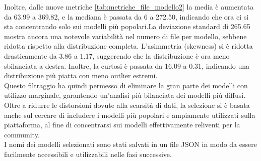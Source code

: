 \documentclass{article}
\begin{document}
Inoltre, dalle nuove metriche \ref{tab:metriche_file_modello2} la media è aumentata da 63.99 a 369.82, e la mediana è passata da 6 a 272.50, indicando che ora ci si sta concentrando solo sui modelli più popolari.La deviazione standard di 265.65 mostra ancora una notevole variabilità nel numero di file per modello, sebbene ridotta rispetto alla distribuzione completa. L’asimmetria (skewness) si è ridotta drasticamente da 3.86 a 1.17, suggerendo che la distribuzione è ora meno sbilanciata a destra. Inoltre, la curtosi è passata da 16.09 a 0.31, indicando una distribuzione più piatta con meno outlier estremi.\\
Questo filtraggio ha quindi permesso di eliminare la gran parte dei modelli con utilizzo marginale, garantendo un'analisi più bilanciata dei modelli più diffusi.
Oltre a ridurre le distorsioni dovute alla scarsità di dati, la selezione si è basata anche sul cercare di includere i modelli più popolari e ampiamente utilizzati sulla piattaforma, al fine di concentrarsi sui modelli effettivamente reliventi per la community.\\
I nomi dei modelli selezionati sono stati salvati in un file JSON in modo da essere facilmente accessibili e utilizzabili nelle fasi successive.
\end{document}
